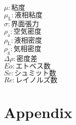 \documentclass[a4j]{jsreport}
\begin{document}
\begin{multicols}{2}
\begin{flushleft}
  $\mu : \text{粘度}$ \\
  $\mu_\mathrm{L} : \text{液相粘度}$ \\
  $\sigma : \text{界面張力}$ \\
  $\rho_\mathrm{a} : \text{空気密度}$ \\
  $\rho_\mathrm{L} : \text{液相密度}$ \\
  $\rho_\mathrm{g} : \text{気相密度}$ \\
  $\varDelta\rho : \text{密度差}$ \\
  $Eo : \text{エトベス数}$ \\
  $Sc : \text{シュミット数}$ \\
  $Re : \text{レイノルズ数}$
\end{flushleft}
\end{multicols}

\newpage
\section*{Appendix}
\end{document}
